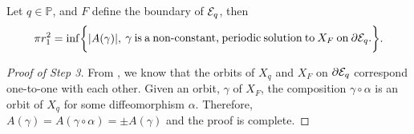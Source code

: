 \documentclass[../main-v2-manifolds.tex]{subfiles}
\begin{document}
\begin{step}
    Let $q\in\mathbb{P}$, and $F$ define the boundary of $\mathcal{E}_q$, then
    \[
        \pi r_1^2 = \inf\bigset{\abs{A(\gamma)},\: \parbox{22em}{$\gamma$ is a non-constant, periodic solution to $X_F$ on $\partial \Epsilon_q$.}}.
    \]   
\end{step}
\begin{proof}[Proof of Step 3]
    From , we know that the orbits of $X_q$ and $X_F$ on $\partial \mathcal{E}_q$ correspond one-to-one with each other. Given an orbit, $\gamma$ of  $X_F$, the composition $\gamma\circ\alpha$ is an orbit of $X_q$ for some diffeomorphism $\alpha$. Therefore, $A(\gamma) = A(\gamma\circ\alpha) = \pm A(\gamma)$ and the proof is complete.
\end{proof}

\ifSubfilesClassLoaded{%
}{}
\end{document}

